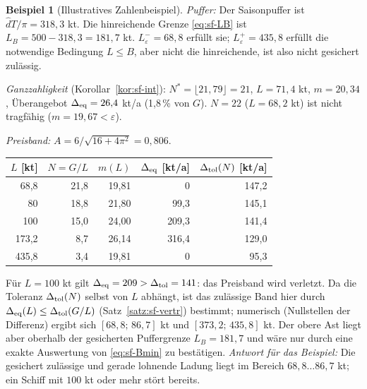 \documentclass[a4paper, 12pt, twoside, openright]{report}
\providecommand{\dhat}{\hat d}      %
\theoremstyle{definition}
\theoremstyle{definition}
\newtheorem{beispiel}{Beispiel}[chapter]
\begin{document}
\begin{beispiel}[Illustratives Zahlenbeispiel]
\emph{Puffer:} Der Saisonpuffer ist $\dhat T/\pi=318{,}3$ kt. Die hinreichende Grenze
\eqref{eq:sf-LB} ist $L_B=500-318{,}3=181{,}7$ kt. $L_\varepsilon^-=68{,}8$ erfüllt sie;
$L_\varepsilon^+=435{,}8$ erfüllt die notwendige Bedingung $L\le B$, aber nicht die
hinreichende, ist also nicht gesichert zulässig.

\emph{Ganzzahligkeit} (Korollar~\ref{kor:sf-int}): $N^*=\lfloor21{,}79\rfloor=21$,
$L=71{,}4$ kt, $m=20{,}34$, Überangebot $\Delta_{\rm eq}=26{,}4$ kt/a (1,8\,\% von $G$).
$N=22$ ($L=68{,}2$ kt) ist nicht tragfähig ($m=19{,}67<\varepsilon$).

\emph{Preisband:} $A=6/\sqrt{16+4\pi^2}=0{,}806$.

\begin{center}
\begin{tabular}{@{}rrrrr@{}}
\toprule
$L$ [kt] & $N=G/L$ & $m(L)$ & $\Delta_{\rm eq}$ [kt/a] & $\Delta_{\rm tol}(N)$ [kt/a]\\
\midrule
68,8 & 21,8 & 19,81 & 0 & 147,2\\
80 & 18,8 & 21,80 & 99,3 & 145,1\\
100 & 15,0 & 24,00 & 209,3 & 141,4\\
173,2 & 8,7 & 26,14 & 316,4 & 129,0\\
435,8 & 3,4 & 19,81 & 0 & 95,3\\
\bottomrule
\end{tabular}
\end{center}

Für $L=100$ kt gilt $\Delta_{\rm eq}=209>\Delta_{\rm tol}=141$: das Preisband wird
verletzt. Da die Toleranz $\Delta_{\rm tol}(N)$ selbst von $L$ abhängt, ist das zulässige Band hier durch $\Delta_{\rm eq}(L)\le\Delta_{\rm tol}(G/L)$ (Satz~\ref{satz:sf-vertr}) bestimmt; numerisch (Nullstellen der Differenz) ergibt sich $[68{,}8;\,86{,}7]$ kt und $[373{,}2;\,435{,}8]$ kt. Der obere
Ast liegt aber oberhalb der gesicherten Puffergrenze $L_B=181{,}7$ und wäre nur durch
eine exakte Auswertung von \eqref{eq:sf-Bmin} zu bestätigen. \emph{Antwort für das
Beispiel:} Die gesichert zulässige und gerade lohnende Ladung liegt im Bereich
$68{,}8\ldots86{,}7$ kt; ein Schiff mit $100$ kt oder mehr stört bereits.
\end{beispiel}
\end{document}
